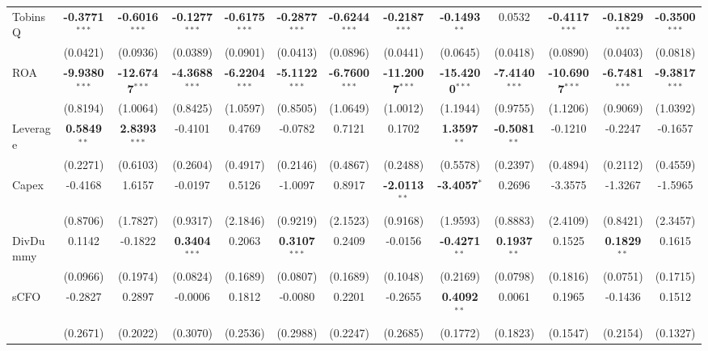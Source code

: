 \documentclass[11pt,a4paper]{article}
\begin{document}
\begin{table}[htbp]
\begin{tabular}{lcccccccccccc}
TobinsQ & \textbf{-0.3771}$^{***}$ & \textbf{-0.6016}$^{***}$ & \textbf{-0.1277}$^{***}$ & \textbf{-0.6175}$^{***}$ & \textbf{-0.2877}$^{***}$ & \textbf{-0.6244}$^{***}$ & \textbf{-0.2187}$^{***}$ & \textbf{-0.1493}$^{**}$ & 0.0532 & \textbf{-0.4117}$^{***}$ & \textbf{-0.1829}$^{***}$ & \textbf{-0.3500}$^{***}$ \\
 & (0.0421) & (0.0936) & (0.0389) & (0.0901) & (0.0413) & (0.0896) & (0.0441) & (0.0645) & (0.0418) & (0.0890) & (0.0403) & (0.0818) \\
ROA & \textbf{-9.9380}$^{***}$ & \textbf{-12.6747}$^{***}$ & \textbf{-4.3688}$^{***}$ & \textbf{-6.2204}$^{***}$ & \textbf{-5.1122}$^{***}$ & \textbf{-6.7600}$^{***}$ & \textbf{-11.2007}$^{***}$ & \textbf{-15.4200}$^{***}$ & \textbf{-7.4140}$^{***}$ & \textbf{-10.6907}$^{***}$ & \textbf{-6.7481}$^{***}$ & \textbf{-9.3817}$^{***}$ \\
 & (0.8194) & (1.0064) & (0.8425) & (1.0597) & (0.8505) & (1.0649) & (1.0012) & (1.1944) & (0.9755) & (1.1206) & (0.9069) & (1.0392) \\
Leverage & \textbf{0.5849}$^{**}$ & \textbf{2.8393}$^{***}$ & -0.4101 & 0.4769 & -0.0782 & 0.7121 & 0.1702 & \textbf{1.3597}$^{**}$ & \textbf{-0.5081}$^{**}$ & -0.1210 & -0.2247 & -0.1657 \\
 & (0.2271) & (0.6103) & (0.2604) & (0.4917) & (0.2146) & (0.4867) & (0.2488) & (0.5578) & (0.2397) & (0.4894) & (0.2112) & (0.4559) \\
Capex & -0.4168 & 1.6157 & -0.0197 & 0.5126 & -1.0097 & 0.8917 & \textbf{-2.0113}$^{**}$ & \textbf{-3.4057}$^{*}$ & 0.2696 & -3.3575 & -1.3267 & -1.5965 \\
 & (0.8706) & (1.7827) & (0.9317) & (2.1846) & (0.9219) & (2.1523) & (0.9168) & (1.9593) & (0.8883) & (2.4109) & (0.8421) & (2.3457) \\
DivDummy & 0.1142 & -0.1822 & \textbf{0.3404}$^{***}$ & 0.2063 & \textbf{0.3107}$^{***}$ & 0.2409 & -0.0156 & \textbf{-0.4271}$^{**}$ & \textbf{0.1937}$^{**}$ & 0.1525 & \textbf{0.1829}$^{**}$ & 0.1615 \\
 & (0.0966) & (0.1974) & (0.0824) & (0.1689) & (0.0807) & (0.1689) & (0.1048) & (0.2169) & (0.0798) & (0.1816) & (0.0751) & (0.1715) \\
sCFO & -0.2827 & 0.2897 & -0.0006 & 0.1812 & -0.0080 & 0.2201 & -0.2655 & \textbf{0.4092}$^{**}$ & 0.0061 & 0.1965 & -0.1436 & 0.1512 \\
 & (0.2671) & (0.2022) & (0.3070) & (0.2536) & (0.2988) & (0.2247) & (0.2685) & (0.1772) & (0.1823) & (0.1547) & (0.2154) & (0.1327) \\

\end{tabular}
\end{table}
\end{document}
